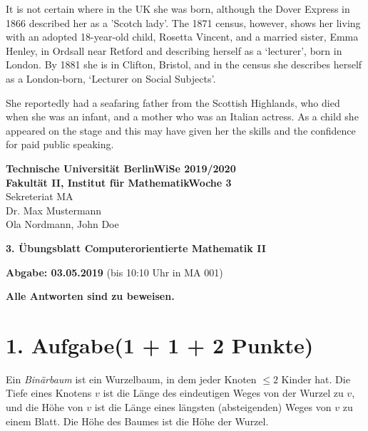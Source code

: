 \documentclass[11pt, a4paper]{article}
\begin{document}
It is not certain where in the UK she was born, although the Dover Express
in 1866 described her as a 'Scotch lady'. The 1871 census, however, shows
her living with an adopted 18-year-old child, Rosetta Vincent, and a married
sister, Emma Henley, in Ordsall near Retford and describing herself as a ‘lecturer’,
born in London. By 1881 she is in Clifton, Bristol, and in the census she
describes herself as a London-born, ‘Lecturer on Social Subjects’.

She reportedly had a seafaring father from the Scottish Highlands,
who died when she was an infant, and a mother who was an Italian actress.
As a child she appeared on the stage and this may have given her the skills
and the confidence for paid public speaking.

\textbf{Technische Universität Berlin}\hfill\textbf{WiSe 2019/2020} \\
\textbf{Fakultät II, Institut für Mathematik}\hfill\textbf{Woche 3} \\
Sekreteriat MA \\
Dr. Max Mustermann \\
Ola Nordmann, John Doe

\vspace{.5cm}
\raggedright

\begin{center}
    {
        \Large
        \textbf{3. Übungsblatt Computerorientierte Mathematik II}
    }
    \large
    
    \vspace{.25cm}
    
    \textbf{Abgabe: 03.05.2019} (bis 10:10 Uhr in MA 001)
    
    \vspace{.25cm}
    
    \textbf{Alle Antworten sind zu beweisen.}
\end{center}

\section*{1. Aufgabe\hfill\textnormal{\normalsize (1 + 1 + 2 Punkte)}}
Ein \emph{Binärbaum} ist ein Wurzelbaum, in dem jeder Knoten $\leq 2$ Kinder hat.
Die Tiefe eines Knotens $v$ ist die Länge des eindeutigen Weges von der Wurzel
zu $v$, und die Höhe von $v$ ist die Länge eines längsten (absteigenden) Weges
von $v$ zu einem Blatt. Die Höhe des Baumes ist die Höhe der Wurzel.
\end{document}
